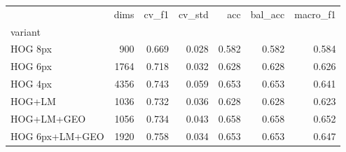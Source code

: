 \begin{tabular}{lrrrrrr}
\toprule
 & dims & cv_f1 & cv_std & acc & bal_acc & macro_f1 \\
variant &  &  &  &  &  &  \\
\midrule
HOG 8px & 900 & 0.669 & 0.028 & 0.582 & 0.582 & 0.584 \\
HOG 6px & 1764 & 0.718 & 0.032 & 0.628 & 0.628 & 0.626 \\
HOG 4px & 4356 & 0.743 & 0.059 & 0.653 & 0.653 & 0.641 \\
HOG+LM & 1036 & 0.732 & 0.036 & 0.628 & 0.628 & 0.623 \\
HOG+LM+GEO & 1056 & 0.734 & 0.043 & 0.658 & 0.658 & 0.652 \\
HOG 6px+LM+GEO & 1920 & 0.758 & 0.034 & 0.653 & 0.653 & 0.647 \\
\bottomrule
\end{tabular}
